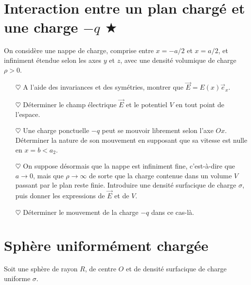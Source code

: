 \documentclass{report}
\begin{document}
\section*{Interaction entre un plan chargé et une charge $-q$ $\bigstar$}

On considère une nappe de charge, comprise entre $x=-a/2$ et $x=a/2$, et infiniment étendue selon les axes $y$ et $z$, avec une densité volumique de charge $\rho>0$.

\begin{itemize}

	\item[$\heartsuit$] A l'aide des invariances et des symétries, montrer que $\vec{E}=E(x)\vec{e}_x$.

	\item[$\heartsuit$] Déterminer le champ électrique $\vec{E}$ et le potentiel $V$ en tout point de l'espace.
	
	\item[$\heartsuit$] Une charge ponctuelle $-q$ peut se mouvoir librement selon l'axe $Ox$. Déterminer la nature de son mouvement en supposant que sa vitesse est nulle en $x=b<a_2$.
	
	\item[$\heartsuit$] On suppose désormais que la nappe est infiniment fine, c'est-à-dire que $a\longrightarrow0$, mais que $\rho\longrightarrow\infty$ de sorte que la charge contenue dans un volume $V$ passant par le plan reste finie. Introduire une densité surfacique de charge $\sigma$, puis donner les expressions de $\vec{E}$ et de $V$.
	
	\item[$\heartsuit$] Déterminer le mouvement de la charge $-q$ dans ce cas-là. 
	
\end{itemize}

\newpage

\section*{Sphère uniformément chargée}
Soit une sphère de rayon $R$, de centre $O$ et de densité surfacique de charge uniforme $\sigma$.
\end{document}
